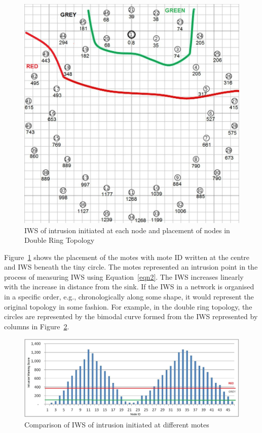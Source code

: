 \documentclass{CRPITStyle}
\begin{document}
\begin{figure}[t]
    \centering
        \includegraphics[width=.8\linewidth]{DoubleRingZ}
        \caption{IWS of intrusion initiated at each node and placement of nodes in Double Ring Topology}
        \label{fig:elliptopo} 
    \end{figure}

Figure~\ref{fig:elliptopo} shows the placement of the motes with mote ID written at the centre and IWS beneath the tiny circle.
The motes represented an intrusion point in the process of measuring IWS using Equation~\ref{eqn2}.
The IWS increases linearly with the increase in distance from the sink.
If the IWS in a network is organised in a specific order, e.g., chronologically  along some shape, 
it would represent the original topology in some fashion.
For example, in the double ring topology, the circles are represented by the bimodal curve formed from the IWS represented by columns in Figure~\ref{fig:ellipgraph}.
\begin{figure}[t]
	\centering
        \includegraphics[width=\linewidth]{DR_Column}
        \caption{Comparison of IWS of intrusion initiated at different motes}
        \label{fig:ellipgraph}
\end{figure}
\end{document}
